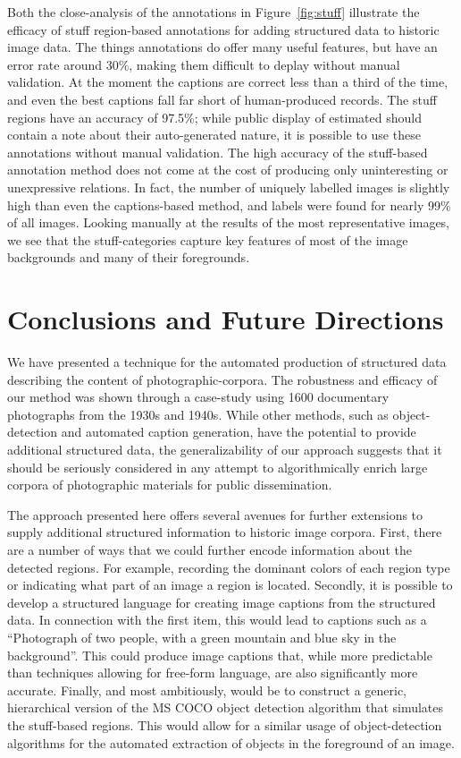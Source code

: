 \documentclass[10pt, a4paper]{article}
\begin{document}
Both the close-analysis of the annotations in Figure~\ref{fig:stuff} illustrate
the efficacy of stuff region-based annotations for adding structured data to
historic image data. The things annotations do offer many useful features, but
have an error rate around 30\%, making them difficult to deplay without manual
validation. At the moment the captions are correct less than a third of the
time, and even the best captions fall far short of human-produced records. The
stuff regions have an accuracy of 97.5\%; while public display of estimated
should contain a note about their auto-generated nature, it is possible to use
these annotations without manual validation. The high accuracy of the
stuff-based annotation method does not come at the cost of producing only
uninteresting or unexpressive relations. In fact, the number of uniquely labelled
images is slightly high than even the captions-based method, and labels were
found for nearly 99\% of all images. Looking manually at the results of the
most representative images, we see that the stuff-categories capture key
features of most of the image backgrounds and many of their foregrounds.

\section{Conclusions and Future Directions} \label{sec:conclude}

We have presented a technique for the automated production of structured
data describing the content of photographic-corpora. The robustness and efficacy
of our method was shown through a case-study using 1600 documentary
photographs from the 1930s and 1940s. While other methods, such as
object-detection and automated caption generation, have the potential to provide
additional structured data, the generalizability of our approach suggests that
it should be seriously considered in any attempt to algorithmically enrich large
corpora of photographic materials for public dissemination.

The approach presented here offers several avenues for further extensions to
supply additional structured information to historic image corpora. First, there
are a number of ways that we could further encode information about the detected
regions. For example, recording the dominant colors of each region type or
indicating what part of an image a region is located. Secondly, it is possible
to develop a structured language for creating image captions from the structured
data. In connection with the first item, this would lead to captions such as a
``Photograph of two people, with a green mountain and blue sky in the
background''. This could produce image captions that, while more predictable
than techniques allowing for free-form language, are also significantly more
accurate. Finally, and most ambitiously, would be to construct a generic,
hierarchical version of the MS COCO object detection algorithm that simulates
the stuff-based regions. This would allow for a similar usage of
object-detection algorithms for the automated extraction of objects in the
foreground of an image.
\end{document}
